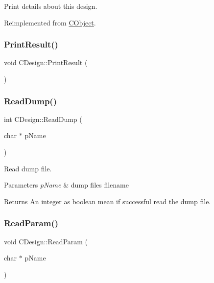 Print details about this design. 



Reimplemented from \mbox{\hyperlink{classCObject_a75afd905b2d14ed374c75d90f079a389}{C\+Object}}.

\mbox{\label{classCDesign_af1fc7df15f389d8051d74c7867d3d6be}} 
\subsubsection{\texorpdfstring{PrintResult()}{PrintResult()}}
{\footnotesize\ttfamily void C\+Design\+::\+Print\+Result (\begin{DoxyParamCaption}{ }\end{DoxyParamCaption})}

\mbox{\label{classCDesign_add678d74b22a8bd58dec921656454bdd}} 
\subsubsection{\texorpdfstring{ReadDump()}{ReadDump()}}
{\footnotesize\ttfamily int C\+Design\+::\+Read\+Dump (\begin{DoxyParamCaption}\item[{char $\ast$}]{p\+Name }\end{DoxyParamCaption})}



Read dump file. 


\begin{DoxyParams}{Parameters}
{\em p\+Name} & dump file\textquotesingle{}s filename \\
\hline
\end{DoxyParams}
\begin{DoxyReturn}{Returns}
An integer as boolean mean if successful read the dump file. 
\end{DoxyReturn}
\mbox{\label{classCDesign_a91266987b4edb768fb3187e92a9cfbbd}} 
\subsubsection{\texorpdfstring{ReadParam()}{ReadParam()}}
{\footnotesize\ttfamily void C\+Design\+::\+Read\+Param (\begin{DoxyParamCaption}\item[{char $\ast$}]{p\+Name }\end{DoxyParamCaption})}



